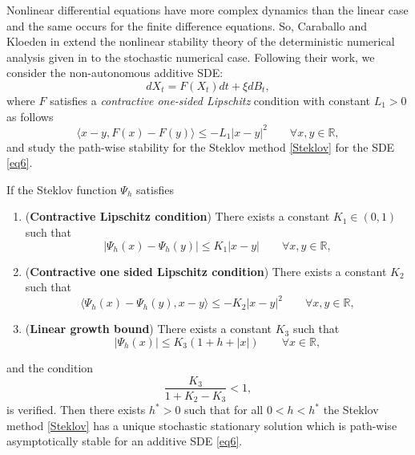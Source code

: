     
    Nonlinear differential equations have more complex  dynamics than the linear case and
    the same  occurs for the finite difference equations. So,  Caraballo and Kloeden in
    \cite{Caraballo2006}  extend the nonlinear stability theory of the deterministic
    numerical  analysis given in \cite{kloeden1999towards} to the stochastic numerical
    case. Following  their work,  we consider the non-autonomous additive SDE:
    \begin{equation}\label{eq6}
      dX_t=F(X_t)dt+\xi dB_t,
    \end{equation}
    where $F$ satisfies a {\it contractive one-sided Lipschitz} condition with constant
    $L_1>0$ as follows
    \begin{equation}\label{cl}
	\langle
	  x-y,F(x)-F(y)
	\rangle\leq
	-L_1|x-y|^2\qquad \forall x,y\in \mathbb{R},
    \end{equation}
    and study the path-wise stability for the Steklov method \eqref{Steklov} for the SDE
    \eqref{eq6}.
    \begin{thm}
      If the Steklov function $\Psi_h$  satisfies
      \begin{enumerate}[({A}1)]
	\item (\textbf{Contractive Lipschitz condition})
	  There exists  a constant $K_1\in (0,1)$ such that
	  $$
	    |\Psi_h(x)-\Psi_h(y)|\leq K_1|x-y| \qquad\forall x,y\in \mathbb{R},
	  $$
	\item (\textbf{Contractive one sided Lipschitz condition})
	  There exists a constant $K_2$ such that
	  $$
	    \langle
	      \Psi_h(x)-\Psi_h(y),x-y
	    \rangle
	    \leq
	    -K_2|x-y|^2 \qquad \forall x,y\in \mathbb{R},
	  $$
	\item (\textbf{Linear growth bound})
	There exists a constant $K_3$ such that
	$$|\Psi_h(x)|\leq K_3(1+h+|x|) \qquad \forall x\in \mathbb{R},$$
      \end{enumerate}
      and the  condition
      \begin{equation}\label{c1}
	\frac{K_3}{1+K_2-K_3}< 1,
      \end{equation}
      is verified. Then there exists $h^*>0$ such that for all $0<h<h^*$ the Steklov
      method \eqref{Steklov} has a unique stochastic stationary solution which is
      path-wise asymptotically stable for an additive SDE \eqref{eq6}.
    \end{thm}

